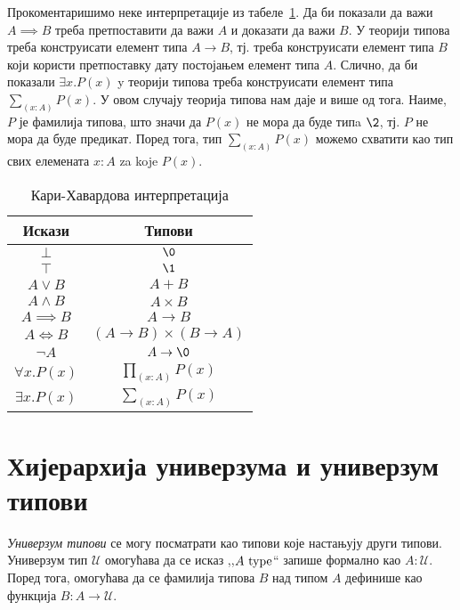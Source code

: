 \documentclass[12pt,oneside]{memoir}
\begin{document}
Прокоментаришимо неке интерпретације из табеле~\ref{table:curry_howard}. Да би показали да важи $A \implies B$ треба претпоставити да важи $A$ и доказати да важи $B$. У теорији типова треба конструисати елемент типа $A \to B$, тј. треба конструисати елемент типа $B$ који користи претпоставку дату постојањем елемент типа $A$. Слично, да би показали $\exists x. P(x)$ y теорији типова треба конструисати елемент типа $\sum_{(x : A)} P(x)$. У овом случају теорија типова нам даје и више од тога. Наиме, $P$ је фамилија типова, што значи да $P(x)$ не мора да буде типa $\2$, тј. $P$ не мора да буде предикат. Поред тога, тип $\sum_{(x : A)} P(x)$ можемо схватити као тип свих елемената $x : A$ za koje $P (x)$. 

\begin{table}
    \begin{center}
        \begin{tabular}[c]{c c}
            Искази & Типови \\
            \hline%
            $\bot$ & $\0$ \\
            $\top$ & $\1$ \\
            $A \lor B$ & $A + B$ \\
            $A \land B$ & $A \times B$ \\
            $A \implies B$ & $A \to B$ \\
            $A \iff B$ & $(A \to B) \times (B \to A)$ \\
            $\neg A$ & $A \to \0$ \\
            $\forall x. P(x)$ & $\prod_{(x : A)} P(x)$ \\
            $\exists x. P(x)$ & $\sum_{(x : A)} P(x)$
        \end{tabular}
    \end{center}
    \caption{Кари\--Хавардова интерпретација}
    \label{table:curry_howard}
\end{table}

\section{Хијерархија универзума и универзум типови}

\emph{Универзум типови} се могу посматрати као типови које настањују други типови. Универзум тип $\mathcal{U}$ омогућава да се исказ ,,$A~{\mathrm{type}}$`` запише формално као $A : \mathcal{U}$. Поред тога, омогућава да се фамилија типова $B$ над типом $A$ дефинише као функција $B : A \to \mathcal{U}$. 
\end{document}
